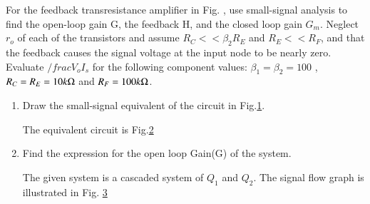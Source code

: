 For the feedback transresistance amplifier in Fig. , use small-signal analysis to find the open-loop gain G, the feedback H, and the closed loop gain $G_m$. Neglect $r_o$ of each of the transistors and assume $R_C << \beta_2R_E$ and $R_E << R_F$, and that the feedback causes the signal voltage at the input node to be nearly zero. Evaluate $/frac{V_o}{I_s}$ for the following component values: $\beta_1 = \beta_2 = 100$ , $R_C = R_E = 10 k\ohm$ and $R_F = 100 k\ohm$.

\begin{enumerate}[label=\arabic*.,ref=\theenumi]

\item Draw the small-signal equivalent of the circuit in Fig.\ref{fig:ee18btech11045_fb_question}.

\begin{figure}[h!]
	\begin{center}
		\resizebox{\columnwidth}{!}{}
	\end{center}
	\caption{}
	\label{fig:ee18btech11045_fb_question}
\end{figure}

\solution

\begin{figure}[h!]
	\begin{center}
		\resizebox{\columnwidth}{!}{}
	\end{center}
	\caption{}
	\label{fig:ee18btech11045_fb_smallsignalmodel}
\end{figure}

The equivalent circuit is Fig.\ref{fig:ee18btech11045_fb_smallsignalmodel}

\item Find the expression for the open loop Gain(G) of the system.

\solution

The given system is a cascaded system of $Q_1$ and $Q_2$.
The signal flow graph is illustrated in Fig. \ref{fig:ee18btech11045_fb_signalflow}

\begin{figure}[h!]
	\begin{center}
		\resizebox{\columnwidth}{!}{}
	\end{center}
	\caption{}
	\label{fig:ee18btech11045_fb_signalflow}
\end{figure}


\end{enumerate}
